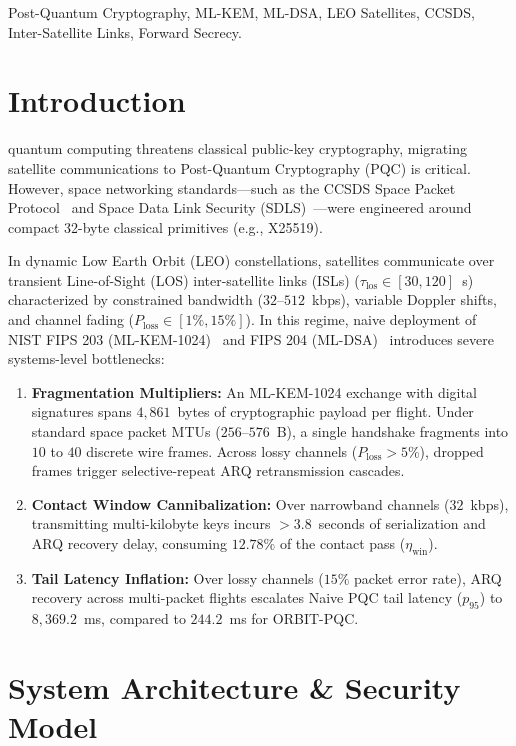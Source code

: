 \documentclass[lettersize,journal]{IEEEtran}
\begin{document}
\begin{IEEEkeywords}
Post-Quantum Cryptography, ML-KEM, ML-DSA, LEO Satellites, CCSDS, Inter-Satellite Links, Forward Secrecy.
\end{IEEEkeywords}

\section{Introduction}
 quantum computing threatens classical public-key cryptography, migrating satellite communications to Post-Quantum Cryptography (PQC) is critical. However, space networking standards—such as the CCSDS Space Packet Protocol~\cite{ccsds_spp} and Space Data Link Security (SDLS)~\cite{ccsds_sdls}—were engineered around compact 32-byte classical primitives (e.g., X25519).

In dynamic Low Earth Orbit (LEO) constellations, satellites communicate over transient Line-of-Sight (LOS) inter-satellite links (ISLs) ($\tau_{\text{los}} \in [30, 120]$~s) characterized by constrained bandwidth ($32$--$512$~kbps), variable Doppler shifts, and channel fading ($P_{\text{loss}} \in [1\%, 15\%]$). In this regime, naive deployment of NIST FIPS 203 (ML-KEM-1024)~\cite{fips203} and FIPS 204 (ML-DSA)~\cite{fips204} introduces severe systems-level bottlenecks:

\begin{enumerate}
    \item \textbf{Fragmentation Multipliers:} An ML-KEM-1024 exchange with digital signatures spans $4{,}861$~bytes of cryptographic payload per flight. Under standard space packet MTUs ($256$--$576$~B), a single handshake fragments into $10$ to $40$ discrete wire frames. Across lossy channels ($P_{\text{loss}} > 5\%$), dropped frames trigger selective-repeat ARQ retransmission cascades.
    \item \textbf{Contact Window Cannibalization:} Over narrowband channels ($32$~kbps), transmitting multi-kilobyte keys incurs $>3.8$~seconds of serialization and ARQ recovery delay, consuming $12.78\%$ of the contact pass ($\eta_{\text{win}}$).
    \item \textbf{Tail Latency Inflation:} Over lossy channels ($15\%$ packet error rate), ARQ recovery across multi-packet flights escalates Naive PQC tail latency ($p_{95}$) to $8{,}369.2$~ms, compared to $244.2$~ms for ORBIT-PQC.
\end{enumerate}

\section{System Architecture \& Security Model}
\end{document}
